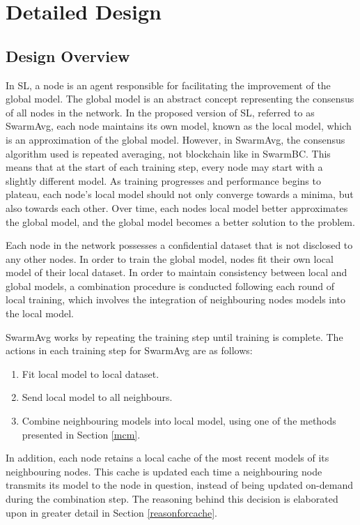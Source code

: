 \chapter{Detailed Design}
\section{Design Overview}
In SL, a node is an agent responsible for facilitating the improvement of the global model. The global model is an abstract concept representing the consensus of all nodes in the network. In the proposed version of SL, referred to as SwarmAvg, each node maintains its own model, known as the local model, which is an approximation of the global model. However, in SwarmAvg, the consensus algorithm used is repeated averaging, not blockchain like in SwarmBC. This means that at the start of each training step, every node may start with a slightly different model. As training progresses and performance begins to plateau, each node's local model should not only converge towards a minima, but also towards each other. Over time, each nodes local model better approximates the global model, and the global model becomes a better solution to the problem.

Each node in the network possesses a confidential dataset that is not disclosed to any other nodes. In order to train the global model, nodes fit their own local model of their local dataset. In order to maintain consistency between local and global models, a combination procedure is conducted following each round of local training, which involves the integration of neighbouring nodes models into the local model.

SwarmAvg works by repeating the training step until training is complete. The actions in each training step for SwarmAvg are as follows:
\begin{enumerate}
	\item Fit local model to local dataset.
	\item Send local model to all neighbours.
	\item Combine neighbouring models into local model, using one of the methods presented in Section \ref{mcm}.
\end{enumerate}

In addition, each node retains a local cache of the most recent models of its neighbouring nodes. This cache is updated each time a neighbouring node transmits its model to the node in question, instead of being updated on-demand during the combination step. The reasoning behind this decision is elaborated upon in greater detail in Section \ref{reasonforcache}.

